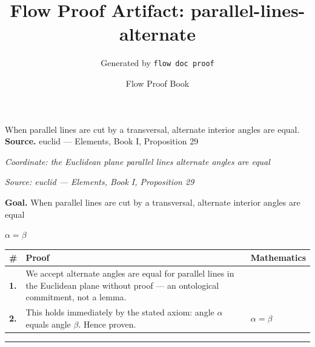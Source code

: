 \documentclass[11pt]{article}
\title{Flow Proof Artifact: parallel-lines-alternate}
\author{Generated by \texttt{flow doc proof}}
\date{Flow Proof Book}
\theoremstyle{definition}
\begin{document}
\maketitle
When parallel lines are cut by a transversal, alternate interior angles are equal.\\[0.5em]
\textbf{Source.} euclid — Elements, Book I, Proposition 29\\[0.5em]
\bigskip
{}\par
\smallskip\noindent\textit{Coordinate: the Euclidean plane \cdot parallel lines \cdot alternate angles are equal}\par
\smallskip\noindent\textit{Source: euclid — Elements, Book I, Proposition 29}\par
\medskip
\noindent\textbf{Goal.} When parallel lines are cut by a transversal, alternate interior angles are equal\par
\noindent$\displaystyle \alpha = \beta$\par
\medskip
\noindent
\begin{tabular}{@{} >{\raggedright\arraybackslash}p{} >{\raggedright\arraybackslash}p{} >{\raggedleft\arraybackslash}p{} @{}}
\textbf{\#} & \textbf{Proof} & \textbf{Mathematics} \\
\midrule
\textbf{1.} & We accept alternate angles are equal for parallel lines in the Euclidean plane without proof — an ontological commitment, not a lemma. & \\[0.45em]
\textbf{2.} & This holds immediately by the stated axiom: angle $\alpha$ equals angle $\beta$. Hence proven. & $\displaystyle \alpha = \beta$ \\[0.45em]
\bottomrule
\end{tabular}
\label{thm:Geometry-parallel lines-alternate_angles_are_equal}
\par\medskip\hrule
\end{document}
